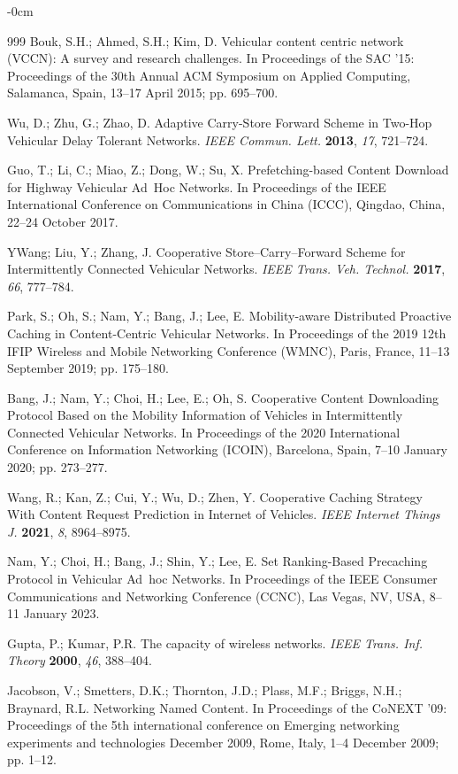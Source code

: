 \documentclass[electronics,aricle,accept,pdftex,moreauthors]{Definitions/mdpi}
\begin{document}
\begin{adjustwidth}{-\extralength}{0cm}
\begin{thebibliography}{999}
 Bouk, S.H.; Ahmed, S.H.; Kim, D. Vehicular content centric network (VCCN): A survey and research challenges. In Proceedings of the {SAC '15: Proceedings of the 30th Annual ACM Symposium on Applied Computing}, Salamanca, Spain,  13--17 April 2015; pp. 695--700.


 Wu, D.; Zhu, G.; Zhao, D. Adaptive Carry-Store Forward Scheme in Two-Hop Vehicular Delay Tolerant Networks. \textit{IEEE Commun. Lett.} \textbf{2013}, \emph{17}, 721--724.

 Guo, T.; Li, C.; Miao, Z.; Dong, W.; Su, X. Prefetching-based Content Download for Highway Vehicular Ad~Hoc Networks. In Proceedings of the IEEE International Conference on Communications in China (ICCC), Qingdao, China, 22--24 October 2017.


 YWang; Liu, Y.; Zhang, J. Cooperative Store–Carry–Forward Scheme for Intermittently Connected Vehicular Networks. \textit{IEEE Trans. Veh. Technol.} \textbf{2017}, \emph{66}, 777--784.

 Park, S.; Oh, S.; Nam, Y.; Bang, J.; Lee, E. Mobility-aware Distributed Proactive Caching in Content-Centric Vehicular Networks. In Proceedings of the  {2019 12th IFIP Wireless and Mobile Networking Conference (WMNC)}, Paris, France, 11--13 September 2019; pp. 175--180.

 Bang, J.; Nam, Y.; Choi, H.; Lee, E.; Oh, S. Cooperative Content Downloading Protocol Based on the Mobility Information of Vehicles in Intermittently Connected Vehicular Networks. In Proceedings of the  {2020 International Conference on Information Networking (ICOIN)}, Barcelona, Spain, 7--10 January 2020; pp. 273--277.

 Wang, R.; Kan, Z.; Cui, Y.; Wu, D.; Zhen, Y. Cooperative Caching Strategy With Content Request Prediction in Internet of Vehicles. \textit{IEEE Internet Things J.} \textbf{2021}, \emph{8}, 8964--8975.

 Nam, Y.; Choi, H.; Bang, J.; Shin, Y.; Lee, E. Set Ranking-Based Precaching Protocol in Vehicular Ad~hoc Networks. In Proceedings of the {IEEE Consumer Communications and Networking Conference (CCNC)}, Las Vegas, NV, USA, 8--11 January 2023.

 Gupta, P.; Kumar, P.R. The capacity of wireless networks. \textit{IEEE Trans. Inf. Theory} \textbf{2000}, \emph{46}, 388--404.

 Jacobson, V.; Smetters, D.K.; Thornton, J.D.; Plass, M.F.; Briggs, N.H.; Braynard, R.L. Networking Named Content. In Proceedings of the {CoNEXT '09: Proceedings of the 5th international conference on Emerging networking experiments and technologies December 2009}, Rome, Italy,  1--4 December 2009; pp. 1--12.


\end{thebibliography}
\end{adjustwidth}
\end{document}
